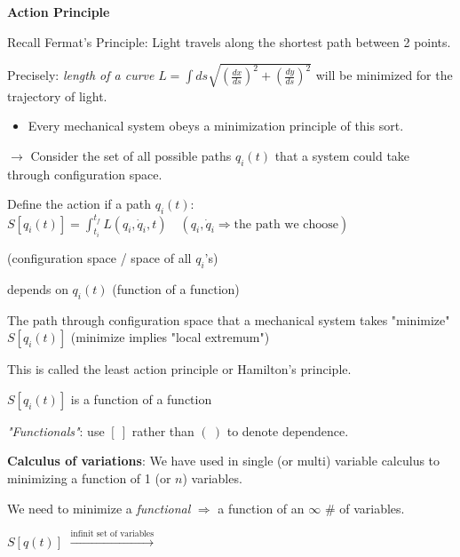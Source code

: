 \documentclass{article}
\begin{document}
\textbf{Action Principle}

Recall Fermat's Principle: Light travels along the shortest path between 2 points.

Precisely: \quad \textit{length of a curve} \quad $L = \int ds \sqrt{ \left( \frac{dx}{ds} \right)^2 + \left( \frac{dy}{ds} \right)^2 }$ \quad will be minimized for the trajectory of light.

\begin{itemize}
    \item Every mechanical system obeys a minimization principle of this sort.
\end{itemize}

$\rightarrow$ Consider the set of all possible paths $q_i(t)$ that a system could take through configuration space.

Define the action if a path $q_i(t)$: \quad $S[q_i(t)] = \int_{t_i}^{t_f} L(q_i, \dot{q}_i, t) \quad (q_i, \dot{q}_i \Rightarrow \text{the path we choose})$

\quad (configuration space / space of all $q_i$'s)

\quad depends on $q_i(t)$ (function of a function)

The path through configuration space that a mechanical system takes "minimize" $S[q_i(t)]$ (minimize implies "local extremum")

This is called the least action principle or Hamilton's principle.

$S[q_i(t)]$ is a function of a function

\textit{"Functionals"}: use $[ \ ]$ rather than $( \ )$ to denote dependence.

\textbf{Calculus of variations}: We have used in single (or multi) variable calculus to minimizing a function of 1 (or $n$) variables.

We need to minimize a \textit{functional} $\Rightarrow$ a function of an $\infty$ \# of variables.

$S[q(t)]$ \quad $\xrightarrow{\text{infinit set of variables}}$
\end{document}
